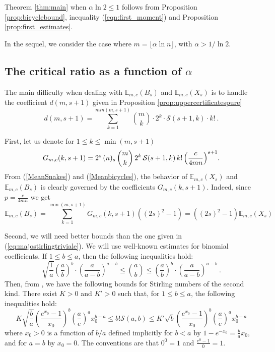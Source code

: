 \documentclass[aop,noinfoline]{imsart}
\newcommand{\calS}{{\mathcal{S}}}
\newcommand{\EE}{\mathbb{E}}
\begin{document}
 Theorem \ref{thm:main} when $\alpha\ln 2\leq 1$ follows from Proposition
 \ref{prop:bicyclebound}, inequality (\ref{eqn:first_moment})  and
 Proposition \ref{prop:first_estimates}.


In the sequel, we consider the case where $m= \lfloor \alpha\ln n\rfloor$, with $\alpha>1/\ln 2$. 

\subsection{The critical ratio as a function of $\alpha$}


 The main  difficulty when dealing with $\EE_{m,c}(B_s)$ and $\EE_{m,c}(X_s)$ is to handle the coefficient $d(m,s+1)$ given in Proposition \ref{prop:uppercertificatespure} 
$$ d(m,s+1) =\sum_{k=1}^{min(m,s+1)} {m\choose k}\cdot 2^k\cdot \calS(s+1,k)
    \cdot k!\ .$$
    
    First, let us denote for  $1\le k \le \min(m,s+1)$ 
         \begin{equation}\label{keyexpression}
     G_{m,c}(k,s+1)= 2^s \,(n)_s \,{m\choose k} \,2^k \,\calS (s+1,k) \,k! \,\Bigl ( \frac {c}{ 4mn}\Bigr )^{s+1}.
     \end{equation}
From (\ref{MeanSnakes}) and (\ref{Meanbicycles}), the behavior of $\EE_{m,c}(X_s)$ and $\EE_{m,c}(B_s)$ is clearly governed by the  coefficients $G_{m,c}(k,s+1)$. Indeed,  since $\displaystyle p=\frac{c}{4mn}$ we get      
         \begin{equation}\label{keyrelation}
\EE_{m,c}(B_s)=  \sum_{k=1}^{\min(m,s+1)} G_{m,c}(k,s+1)((2s)^2 -1) = ((2s)^2 -1) \EE_{m,c}(X_s)
\end{equation}

Second, we will need   better bounds than the one given in (\ref{eq:majostirlingtriviale}). We will use  well-known estimates for binomial coefficients.  If $1\le b \le a$, then the following inequalities hold:
\begin{equation}\label{binomialbounds}  \sqrt{\frac{1}{a}}\left (\frac{a}{b}\right )^b\cdot \left
    (\frac{a}{a-b}\right )^{a-b} \le  {\binom{a}{b}}\le \left (\frac{a}{b}\right )^b\cdot \left
    (\frac{a}{a-b}\right )^{a-b} \ .
   \end{equation}
Then, from  \cite{Temme-93}, we have the following bounds
for Stirling numbers of the second kind. There exist  
$K>0$ and $K'>0$ such that, for $1\le b\le a$, the following inequalities hold:
\begin{equation}\label{Stirlingbounds}
K  \sqrt{\frac{b}{a}}\left (\frac{e^{x_0}-1}{x_0}\right
)^b \left ( \frac{a}{e}\right )^a x_0^{b-a}\le b! \calS(a,b)\le K'   \sqrt{b}\left (\frac{e^{x_0}-1}{x_0}\right
)^b \left ( \frac{a}{e}\right )^a  x_0^{b-a} \end{equation} 
where $x_0>0$ is a function of $b/a$ defined implicitly for $b<a$ by
 $1-e^{-x_0}=\frac{b}{a}x_0$, and for $a=b$ by $x_0=0$.
The conventions are that $0^0=1$ and $\frac{e^0-1}{0}=1$.
\end{document}
